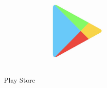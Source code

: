 \begin{figure}[htbp]	
	\centering
	\includegraphics[width=8cm]{immagini/playstore.jpg}
	\caption{Play Store}
	\label{fig:Play Store}
\end{figure}


